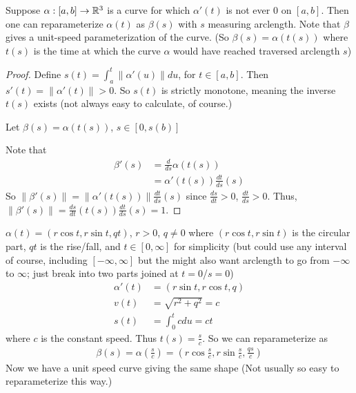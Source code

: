 \begin{theorem}
  Suppose $\alpha: [a, b] \rightarrow \mathbb{R}^3$ is a curve for which
  $\alpha'(t)$ is not ever $0$ on $[a, b]$. Then one can
  reparameterize $\alpha(t)$ as $\beta(s)$ with $s$ measuring
  arclength. Note that $\beta$ gives a unit-speed parameterization of
  the curve. (So $\beta(s) = \alpha(t(s))$ where $t(s)$ is the time at
  which the curve $\alpha$ would have reached traversed arclength $s$)
\end{theorem}
\begin{proof}
  Define $s(t) = \int_{a}^t \|\alpha'(u)\| du$, for $t \in [a,
  b]$. Then $s'(t) = \|\alpha'(t)\| > 0$. So $s(t)$ is strictly
  monotone, meaning the inverse $t(s)$ exists (not always easy to
  calculate, of course.)

Let $\beta(s) = \alpha(t(s))$, $s \in [0, s(b)]$

Note that
\begin{align*}
  \beta'(s) &= \frac{d}{ds} \alpha(t(s)) \\
&= \alpha'(t(s)) \frac{dt}{ds}(s)
\end{align*}
So $\|\beta'(s)\| = \|\alpha'(t(s))\| \frac{dt}{ds}(s)$ since
$\frac{ds}{dt} > 0$, $\frac{dt}{ds} > 0$.
Thus, $\|\beta'(s)\| =
\frac{ds}{dt}(t(s)) \frac{dt}{ds}(s) = 1$.

\end{proof}

\begin{example}
  $\alpha(t) = (r\cos t, r\sin t, qt)$, $r > 0$, $q \neq 0$ where
  $(r\cos t, r\sin t)$ is the circular part, $qt$ is the rise/fall,
  and $t \in [0, \infty]$ for simplicity (but could use any interval
  of course, including $[-\infty, \infty]$ but the might also want
  arclength to go from $-\infty$ to $\infty$; just break into two
  parts joined at $t = 0$/$s = 0$)
  \begin{align*}
    \alpha'(t) &= (r\sin t, r\cos t, q) \\
    v(t) &= \sqrt{r^2 + q^2} = c \\
    s(t) &= \int_0^t c du = ct
  \end{align*}
  where $c$ is the constant speed. Thus $t(s) = \frac{s}{c}$. So we
  can reparameterize as
  \begin{align*}
    \beta(s) = \alpha(\frac{s}{c}) = (r\cos \frac{s}{c}, r\sin
    \frac{s}{c}, \frac{qs}{c})
  \end{align*}
  Now we have a unit speed curve giving the same shape (Not usually so
  easy to reparameterize this way.)
\end{example}
